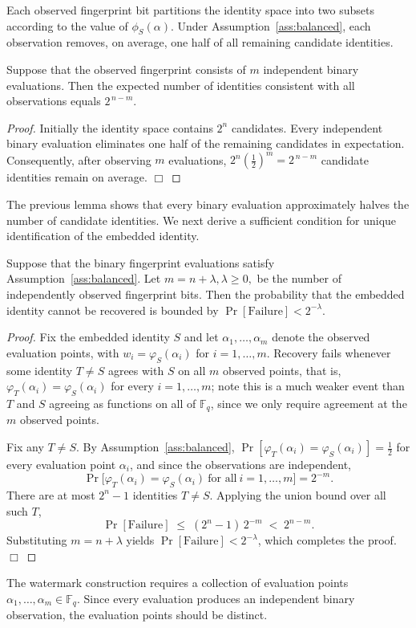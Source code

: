 \documentclass[a4paper,11pt]{llncs}
\begin{document}
Each observed fingerprint bit partitions the identity space into two
subsets according to the value of
$\phi_S(\alpha).$
Under Assumption~\ref{ass:balanced}, each observation removes,
on average, one half of all remaining candidate identities.
%
\begin{lemma}
\label{lem:candidates}
Suppose that the observed fingerprint consists of
$m$
independent binary evaluations.
Then the expected number of identities consistent with all observations
equals
$2^{\,n-m}.$
\end{lemma}
%
\begin{proof}
Initially the identity space contains
$2^n$
candidates.
Every independent binary evaluation eliminates one half of the remaining
candidates in expectation.
Consequently, after observing
$m$
evaluations,
$2^n
\left(\frac12\right)^m
=
2^{\,n-m}$
candidate identities remain on average.
\hfill$\Box$
\end{proof}
%
The previous lemma shows that every binary evaluation approximately
halves the number of candidate identities. We next derive a sufficient
condition for unique identification of the embedded identity.
%
\begin{theorem}
\label{thm:main}
Suppose that the binary fingerprint evaluations satisfy
Assumption~\ref{ass:balanced}. Let
$m=n+\lambda,
\lambda\ge0,$
be the number of independently observed fingerprint bits.
Then the probability that the embedded identity cannot be recovered is
bounded by
$\Pr[\mathrm{Failure}]
<
2^{-\lambda}.$
\end{theorem}
%
\begin{proof}
Fix the embedded identity $S$ and let $\alpha_1,\ldots,\alpha_m$ denote the observed
evaluation points, with $w_i=\varphi_S(\alpha_i)$ for $i=1,\ldots,m$. Recovery fails
whenever some identity $T\ne S$ agrees with $S$ on all $m$ observed points, that is,
$\varphi_T(\alpha_i)=\varphi_S(\alpha_i)$ for every $i=1,\ldots,m$; note this is a much
weaker event than $T$ and $S$ agreeing as functions on all of $\mathbb F_q$, since we
only require agreement at the $m$ observed points.

Fix any $T\ne S$. By Assumption~\ref{ass:balanced}, $\Pr[\varphi_T(\alpha_i)=\varphi_S(\alpha_i)]=\frac12$
for every evaluation point $\alpha_i$, and since the observations are independent,
\[
\Pr\bigl[\varphi_T(\alpha_i)=\varphi_S(\alpha_i)\ \text{for all}\ i=1,\ldots,m\bigr] = 2^{-m}.
\]
There are at most $2^n-1$ identities $T\ne S$. Applying the union bound over all such $T$,
\[
\Pr[\mathrm{Failure}] \;\le\; (2^n-1)\,2^{-m} \;<\; 2^{n-m}.
\]
Substituting $m=n+\lambda$ yields $\Pr[\mathrm{Failure}]<2^{-\lambda}$, which completes the
proof.
\hfill$\Box$
\end{proof}
%
The watermark construction requires a collection of evaluation points
$\alpha_1,\ldots,\alpha_m
\in
\mathbb F_q.$
Since every evaluation produces an independent binary observation,
the evaluation points should be distinct.
\end{document}
